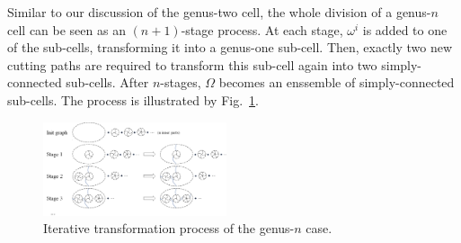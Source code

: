 \documentclass[conference]{IEEEtran}
\begin{document}
Similar to our discussion of the genus-two cell, the whole division of a genus-$n$ cell can be seen as an $(n+1)$-stage process. 
At each stage, $\omega^i$ is added to one of the sub-cells, transforming it into a genus-one sub-cell. Then, exactly two new cutting paths are required to transform this sub-cell again into two simply-connected sub-cells. 
After $n$-stages, $\Omega$ becomes an enssemble of simply-connected sub-cells. The process is illustrated 
by Fig.~\ref{fig_iterative_process}. 

\begin{figure}[t]
\centering
\includegraphics[width=0.48\textwidth]{figures/proof/fig_iterative_process_2}
\caption{Iterative transformation process of the genus-$n$ case.}%
\label{fig_iterative_process}
\end{figure}

\end{document}
